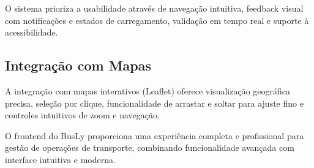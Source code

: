 O sistema prioriza a usabilidade através de navegação intuitiva, feedback visual com notificações e estados de carregamento, validação em tempo real e suporte à acessibilidade.

\subsection{Integração com Mapas}

A integração com mapas interativos (Leaflet) oferece visualização geográfica precisa, seleção por clique, funcionalidade de arrastar e soltar para ajuste fino e controles intuitivos de zoom e navegação.

O frontend do BusLy proporciona uma experiência completa e profissional para gestão de operações de transporte, combinando funcionalidade avançada com interface intuitiva e moderna.

